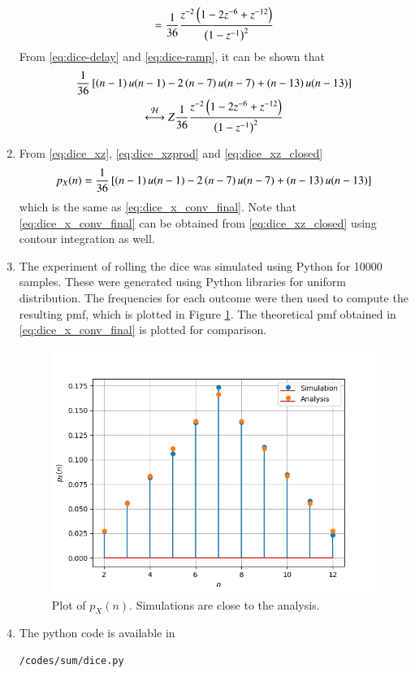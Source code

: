 \documentclass[journal,12pt,twocolumn]{IEEEtran}
\renewcommand\thesection{\arabic{section}}
\begin{document}
\begin{enumerate}[label=\thesection.\arabic*.,ref=\thesection.\theenumi]
\begin{align}
= \frac{1}{36}\frac{z^{-2}\brak{1-2z^{-6}+z^{-12}}}{\brak{1-z^{-1}}^2}
\label{eq:dice_xzprod}
\end{align}
From
\eqref{eq:dice-delay}
and 
\eqref{eq:dice-ramp},
it can be shown that
\begin{multline}
\frac{1}{36}\sbrak{\brak{n-1}u(n-1) - 2 \brak{n-7}u(n-7)
	+\brak{n-13}u(n-13)}
	\\
	\system{Z}
\frac{1}{36}\frac{z^{-2}\brak{1-2z^{-6}+z^{-12}}}{\brak{1-z^{-1}}^2}
\label{eq:dice_xz_closed}
\end{multline}
	\item From \eqref{eq:dice_xz}, \eqref{eq:dice_xzprod} and \eqref{eq:dice_xz_closed}
\begin{multline}
p_{X}(n) = \frac{1}{36}{}\left[\left(n-1\right)u(n-1) 
- 2 \left(n-7\right)u(n-7)+\left(n-13\right)u(n-13)\right]
\end{multline}
which is the same as \eqref{eq:dice_x_conv_final}.  Note that  \eqref{eq:dice_x_conv_final} can be obtained from \eqref{eq:dice_xz_closed} using contour integration as well.
\item 
The experiment of rolling the dice was simulated using Python for 10000 samples.  These were generated using Python libraries for uniform distribution. The frequencies for each outcome were then used to compute the resulting pmf, which  is plotted in Figure \ref{fig:dice}.  The theoretical pmf obtained in \eqref{eq:dice_x_conv_final} is plotted for comparison.  
%
\begin{figure}[!ht]
\centering
\includegraphics[width=\columnwidth]{./conv-trans/figs/sum/pmf.png}
\caption{Plot of $p_X(n)$.  Simulations are close to the analysis. }
\label{fig:dice}
\end{figure}
\item The python code is available in 
\begin{lstlisting}
/codes/sum/dice.py
\end{lstlisting}


\end{enumerate}
\end{document}
